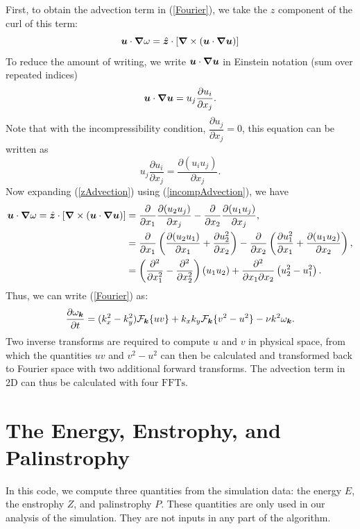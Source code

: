 \documentclass[12pt]{article}
\def\Eq#1{(\ref{#1})}
\begin{document}
First, to obtain the advection term in \Eq{Fourier}, we take the $z$ component of the curl of this term:
\begin{equation}\label{zAdvection}
{\bm u}\cdot\bm\nabla\omega =\hat{{\bm z}}\cdot \left[\bm\nabla \times \left({\bm u}\cdot\bm\nabla{\bm u} \right)\right]
\end{equation}
To reduce the amount of writing, we write ${\bm u}\cdot\bm\nabla{\bm u}$ in Einstein notation (sum over repeated indices)
$${\bm u}\cdot\bm\nabla{\bm u} =u_j\dfrac{\partial u_i}{\partial x_j}.$$
Note that with the incompressibility condition, $\dfrac{\partial u_j}{\partial x_j} =0$, this equation can be written as 
\begin{equation}\label{incompAdvection}
u_j\dfrac{\partial u_i}{\partial x_j} = \dfrac{\partial (u_iu_j)}{\partial x_j}.
\end{equation}
Now expanding \Eq{zAdvection} using \Eq{incompAdvection}, we have
\begin{align*}
{\bm u}\cdot\bm\nabla\omega =\hat{{\bm z}}\cdot \left[\bm\nabla \times \left({\bm u}\cdot\bm\nabla{\bm u} \right)\right]&= \dfrac{\partial }{\partial x_1}\dfrac{\partial (u_2u_j)}{\partial x_j}  - \dfrac{\partial }{\partial x_2}\dfrac{\partial (u_1u_j)}{\partial x_j},\\
&= \dfrac{\partial }{\partial x_1}\left(\dfrac{\partial (u_2u_1)}{\partial x_1}+\dfrac{\partial u_2^2}{\partial x_2}\right)  - \dfrac{\partial }{\partial x_2}\left(\dfrac{\partial u_1^2}{\partial x_1}+\dfrac{\partial (u_1u_2)}{\partial x_2}\right),\\
&= \left(\frac{\partial^2}{\partial x_1^2} - \frac{\partial^2}{\partial x_2^2}\right)(u_1u_2) +\frac{\partial^2}{\partial x_1\partial x_2}\left(u_2^2-u_1^2\right).\\
\end{align*}
Thus, we can write \Eq{Fourier} as:
\begin{equation}\label{evolutionary}
  \frac{\partial\omega_{{\bm k}}}{\partial t} =
  (k_x^2-k_y^2) {\mathcal F}_{\bm k}\{uv\}+k_xk_y{\mathcal F}_{\bm k}\{v^2-u^2\} -\nu k^2\omega_{{\bm k}}.
\end{equation}
Two inverse transforms are required to compute $u$ and $v$ in physical
space, from which the quantities $uv$ and $v^2-u^2$ can then be
calculated and transformed back to Fourier space with two additional
forward transforms. The advection term in 2D can thus be calculated with four $\text{FFTs}$.
\section{The Energy, Enstrophy, and Palinstrophy} 
In this code, we compute three quantities from the simulation data: the energy $E$, the enstrophy $Z$, and palinstrophy $P$.  These quantities are only used in our analysis of the simulation. They are not inputs in any part of the algorithm. 
\end{document}
